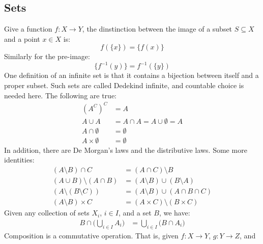 \documentclass[crop=false,class=book,oneside]{standalone}
\begin{document}
        \subsection{Sets}
            Give a function $f:X\rightarrow{Y}$, the dinstinction
            between the image of a subset $S\subseteq{X}$ and a
            point $x\in{X}$ is:
            \begin{equation}
                f(\{x\})=\{f(x)\}
            \end{equation}
            Similarly for the pre-image:
            \begin{equation}
                \{f^{\minus{1}}(y)\}=f^{\minus{1}}(\{y\})
            \end{equation}
            One definition of an infinite set is that it contains
            a bijection between itself and a proper subset. Such
            sets are called Dedekind infinite, and countable choice is
            needed here. The following are true:
            \begin{align}
                (A^{C})^{C}&=A\\
                A\cup{A}&=A\cap{A}=A\cup\emptyset=A\\
                A\cap\emptyset&=\emptyset\\
                A\times\emptyset&=\emptyset
            \end{align}
            In addition, there are De Morgan's laws and the distributive
            laws. Some more identities:
            \begin{align}
                (A\setminus{B})\cap{C}&=(A\cap{C})\setminus{B}\\
                (A\cup{B})\setminus(A\cap{B})
                    &=(A\setminus{B})\cup(B\setminus{A})\\
                (A\setminus(B\setminus{C}))
                    &=(A\setminus{B})\cup(A\cap{B}\cap{C})\\
                (A\setminus{B})\times{C}
                    &=(A\times{C})\setminus(B\times{C})
            \end{align}
            Given any collection of sets $X_{i}$, $i\in{I}$, and a
            set $B$, we have:
            \begin{align}
                B\cap\Big(\bigcup_{i\in{I}}A_{i}\Big)
                    &=\bigcup_{i\in{I}}\Big(B\cap{A_{i}}\Big)
            \end{align}
            Composition is a commutative operation. That is, given
            $f:X\rightarrow{Y}$, $g:Y\rightarrow{Z}$, and
\end{document}

